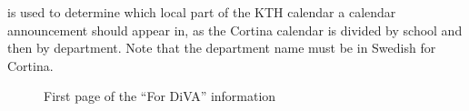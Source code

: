 \noindent is used to determine which local part of the KTH calendar a calendar announcement should appear in, as the Cortina calendar is divided by school and then by department. Note that the department name must be in Swedish for Cortina.
\clearpage
\begin{figure}[!ht]
  \begin{center}
  \end{center}
  \caption{First page of the “For DiVA” information}
  \label{fig:sampleFOrDIVApage1}
\end{figure}
\clearpage
